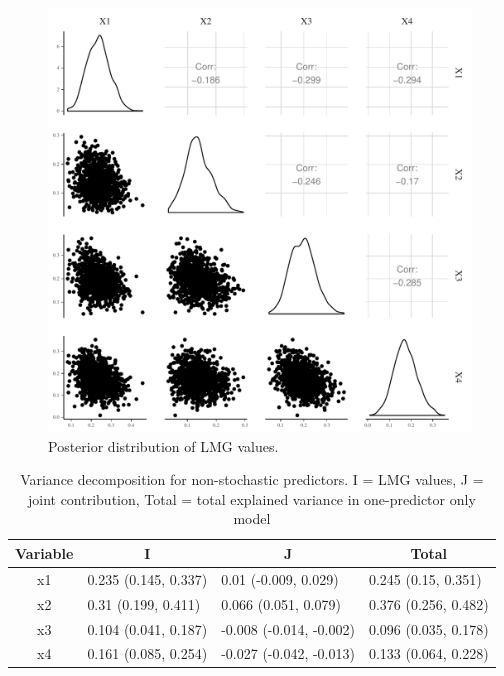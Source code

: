 \documentclass[11pt,a4paper,twoside]{book}
\newenvironment{knitrout}{}{} %
\begin{document}
\begin{knitrout}
\color{fgcolor}\begin{figure}

{\centering \includegraphics[width=\textwidth-3cm]{figure/ch03_figsimdata_LMG_plot-1} 

}

\caption[Posterior distribution of LMG values]{Posterior distribution of LMG values.}\label{fig:simdata.LMG.plot}
\end{figure}


\end{knitrout}

\begin{table}[h]
\caption{Variance decomposition for non-stochastic predictors. I = LMG values, J = joint contribution, Total = total explained variance in one-predictor only model}
\centering
\begin{tabular}{clll}
  \toprule
  \multicolumn{1}{c}{\textbf{Variable}} & \multicolumn{1}{c}{\textbf{I}} &\multicolumn{1}{c}{\textbf{J}} & \multicolumn{1}{c}{\textbf{Total}} \\
  \hline
x1 & 0.235 (0.145, 0.337)  & 0.01 (-0.009, 0.029)   & 0.245 (0.15, 0.351)  \\ 
x2 & 0.31 (0.199, 0.411)  & 0.066 (0.051, 0.079)   & 0.376 (0.256, 0.482)  \\ 
x3 & 0.104 (0.041, 0.187)  & -0.008 (-0.014, -0.002)   & 0.096 (0.035, 0.178)  \\ 
x4 & 0.161 (0.085, 0.254)  & -0.027 (-0.042, -0.013)   & 0.133 (0.064, 0.228)  \\ 
   \bottomrule
\end{tabular}
\label{tbl:nonstochEx1}
\end{table}
\end{document}
